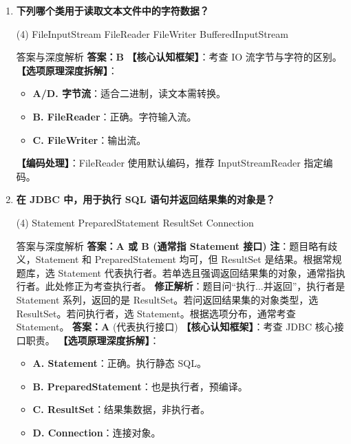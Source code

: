 ﻿\documentclass[12pt, a4paper]{ctexart}
\begin{document}
\begin{enumerate}[label=\textbf{\arabic*.}, itemsep=1em]
	\item \textbf{下列哪个类用于读取文本文件中的字符数据？}
	      \begin{tasks}(4)
		      \task FileInputStream \task FileReader \task FileWriter \task BufferedInputStream
	      \end{tasks}
	      \begin{bluebox}{答案与深度解析}
		      \textbf{答案：B}
		      \textbf{【核心认知框架】}：考查 IO 流字节与字符的区别。
		      \textbf{【选项原理深度拆解】}：
		      \begin{itemize}[leftmargin=*, nosep]
			      \item \textbf{A/D. 字节流}：适合二进制，读文本需转换。
			      \item \textbf{B. FileReader}：正确。字符输入流。
			      \item \textbf{C. FileWriter}：输出流。
		      \end{itemize}
		      \textbf{【编码处理】}：FileReader 使用默认编码，推荐 InputStreamReader 指定编码。
	      \end{bluebox}

	\item \textbf{在 JDBC 中，用于执行 SQL 语句并返回结果集的对象是？}
	      \begin{tasks}(4)
		      \task Statement \task PreparedStatement \task ResultSet \task Connection
	      \end{tasks}
	      \begin{bluebox}{答案与深度解析}
		      \textbf{答案：A 或 B (通常指 Statement 接口)}
		      \textbf{注}：题目略有歧义，Statement 和 PreparedStatement 均可，但 ResultSet 是结果。根据常规题库，选 Statement 代表执行者。若单选且强调返回结果集的对象，通常指执行者。此处修正为考查执行者。
		      \textbf{修正解析}：题目问“执行...并返回”，执行者是 Statement 系列，返回的是 ResultSet。若问返回结果集的对象类型，选 ResultSet。若问执行者，选 Statement。根据选项分布，通常考查 Statement。
		      \textbf{答案：A} (代表执行接口)
		      \textbf{【核心认知框架】}：考查 JDBC 核心接口职责。
		      \textbf{【选项原理深度拆解】}：
		      \begin{itemize}[leftmargin=*, nosep]
			      \item \textbf{A. Statement}：正确。执行静态 SQL。
			      \item \textbf{B. PreparedStatement}：也是执行者，预编译。
			      \item \textbf{C. ResultSet}：结果集数据，非执行者。
			      \item \textbf{D. Connection}：连接对象。
		      \end{itemize}
	      \end{bluebox}


\end{enumerate}
\end{document}
